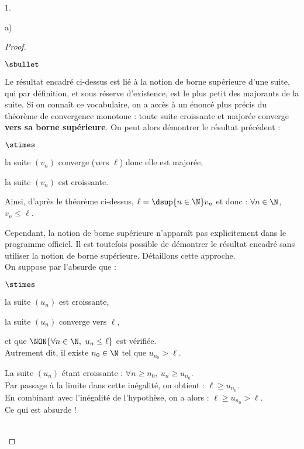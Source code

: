 \begin{noliste}{1.}
\begin{noliste}{a)}
\begin{proof}
\begin{remark}
\begin{noliste}{$\sbullet$}
          \item Le résultat encadré ci-dessus est lié à la notion de
            borne supérieure d'une suite, qui par définition, et sous
            réserve d'existence, est le plus petit des majorants de la
            suite. Si on connaît ce vocabulaire, on a accès à un
            énoncé plus précis du théorème de convergence monotone :
            toute suite croissante et majorée converge {\bf vers sa
              borne supérieure}. On peut alors démontrer le résultat
            précédent :
            \begin{noliste}{$\stimes$}
            \item la suite $(v_n)$ converge (vers $\ell$) donc elle
              est majorée,
            \item la suite $(v_n)$ est croissante.
            \end{noliste}
            Ainsi, d'après le théorème ci-dessus, $\ell = \dsup{n \in
              \N} v_n$ et donc : $\forall n \in \N$, $v_n \leq \ell$.

          \item Cependant, la notion de borne supérieure n'apparaît
            pas explicitement dans le programme officiel. Il est
            toutefois possible de démontrer le résultat encadré sans
            utiliser la notion de borne supérieure. Détaillons cette
            approche.\\[.2cm]
            On suppose par l'absurde que :
            \begin{liste}{$\stimes$}
            \item la suite $(u_n)$ est croissante,
            \item la suite $(u_n)$ converge vers $\ell$,
            \item et que $\NON{\forall n \in \N, \ u_n \leq \ell}$ est
              vérifiée.\\
              Autrement dit, il existe $n_0 \in \N$ tel que $u_{n_0} > \ell$.
            \end{liste}
            La suite $(u_n)$ étant croissante : $\forall n \geq
            n_0, \ u_n \geq u_{n_0}$.\\[.2cm]
            Par passage à la limite dans cette inégalité, on obtient :
            $\ell \geq u_{n_0}$.\\
            En combinant avec l'inégalité de l'hypothèse, on a alors :
            $\ell \geq u_{n_0} > \ell$.\\
            Ce qui est absurde !
          \end{noliste}
        \end{remark}~\\[-1.4cm]
      \end{proof}


\end{noliste}
\end{noliste}
